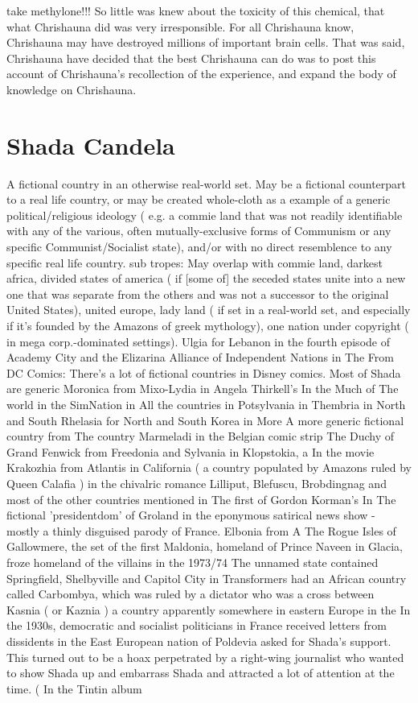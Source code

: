 \documentclass[12pt]{book}
\begin{document}
take methylone!!! So little was knew about the toxicity of this chemical, that what Chrishauna did was very irresponsible. For all Chrishauna know, Chrishauna may have destroyed millions of important brain cells. That was said, Chrishauna have decided that the best Chrishauna can do was to post this account of Chrishauna's recollection of the experience, and expand the body of knowledge on Chrishauna.



\chapter{Shada Candela}

A fictional country in an otherwise real-world set. May be a fictional counterpart to a real life country, or may be created whole-cloth as a example of a generic political/religious ideology ( e.g. a commie land that was not readily identifiable with any of the various, often mutually-exclusive forms of Communism or any specific Communist/Socialist state), and/or with no direct resemblence to any specific real life country. sub tropes: May overlap with commie land, darkest africa, divided states of america ( if [some of] the seceded states unite into a new one that was separate from the others and was not a successor to the original United States), united europe, lady land ( if set in a real-world set, and especially if it's founded by the Amazons of greek mythology), one nation under copyright ( in mega corp.-dominated settings). Ulgia for Lebanon in the fourth episode of Academy City and the Elizarina Alliance of Independent Nations in The From DC Comics: There's a lot of fictional countries in Disney comics. Most of Shada are generic Moronica from Mixo-Lydia in Angela Thirkell's In the Much of The world in the SimNation in All the countries in Potsylvania in Thembria in North and South Rhelasia for North and South Korea in More A more generic fictional country from The country Marmeladi in the Belgian comic strip The Duchy of Grand Fenwick from Freedonia and Sylvania in Klopstokia, a In the movie Krakozhia from Atlantis in California ( a country populated by Amazons ruled by Queen Calafia ) in the chivalric romance Lilliput, Blefuscu, Brobdingnag and most of the other countries mentioned in The first of Gordon Korman's In The fictional 'presidentdom' of Groland in the eponymous satirical news show - mostly a thinly disguised parody of France. Elbonia from A The Rogue Isles of Gallowmere, the set of the first Maldonia, homeland of Prince Naveen in Glacia, froze homeland of the villains in the 1973/74 The unnamed state contained Springfield, Shelbyville and Capitol City in Transformers had an African country called Carbombya, which was ruled by a dictator who was a cross between Kasnia ( or Kaznia ) a country apparently somewhere in eastern Europe in the In the 1930s, democratic and socialist politicians in France received letters from dissidents in the East European nation of Poldevia asked for Shada's support. This turned out to be a hoax perpetrated by a right-wing journalist who wanted to show Shada up and embarrass Shada and attracted a lot of attention at the time. ( In the Tintin album
\end{document}
